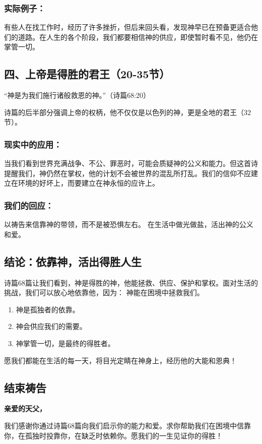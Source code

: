 \documentclass[a4paper, 12pt]{article}
\begin{document}
\subsubsection*{实际例子：}
有些人在找工作时，经历了许多挫折，但后来回头看，发现神早已在预备更适合他们的道路。在人生的各个阶段，我们都要相信神的供应，即使暂时看不见，他仍在掌管一切。
\subsection*{四、上帝是得胜的君王（20-35节）}
“神是为我们施行诸般救恩的神。”（诗篇68:20）

诗篇的后半部分强调上帝的权柄，他不仅仅是以色列的神，更是全地的君王（32节）。
\subsubsection*{现实中的应用：}
当我们看到世界充满战争、不公、罪恶时，可能会质疑神的公义和能力。但这首诗提醒我们，神仍然在掌权，他的计划不会被世界的混乱所打乱。我们的信仰不应建立在环境的好坏上，而要建立在神永恒的应许上。
\subsubsection*{我们的回应：}
以祷告来信靠神的带领，而不是被恐惧左右。
在生活中做光做盐，活出神的公义和爱。
\subsection*{结论：依靠神，活出得胜人生}
诗篇68篇让我们看到，神是得胜的神，他能拯救、供应、保护和掌权。面对生活的挑战，我们可以放心地依靠他，因为：
神能在困境中拯救我们。
\begin{enumerate}
    \item 神是孤独者的依靠。

    \item 神会供应我们的需要。

    \item 神掌管一切，是最终的得胜者。

\end{enumerate}

愿我们都能在生活的每一天，将目光定睛在神身上，经历他的大能和恩典！
\subsection*{结束祷告}
\textbf{亲爱的天父，}

我们感谢你通过诗篇68篇向我们启示你的能力和爱。求你帮助我们在困境中信靠你，在孤独时投靠你，在缺乏时依赖你。愿我们的一生见证你的得胜！
\end{document}
